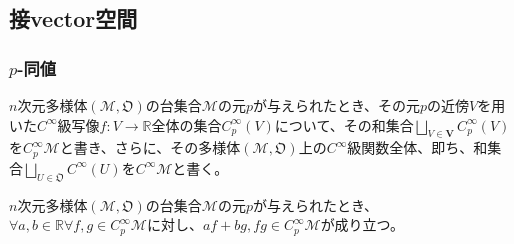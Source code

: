 \documentclass[dvipdfmx]{jsarticle}
\begin{document}
\subsection{接vector空間}
\subsubsection{$p$-同値}
\begin{dfn}
  $n$次元多様体$\left(\mathcal{M},\mathfrak{O}\right)$の台集合$\mathcal{M}$の元$p$が与えられたとき、その元$p$の近傍$V$を用いた$C^{\infty} $級写像$f:V\rightarrow \mathbb{R} $全体の集合$C^\infty_p \left( V\right)$について、その和集合$\bigsqcup_{V\in \mathbf{V}} C^\infty_p \left( V\right)$を$C^\infty_p \mathcal{M}$と書き、さらに、その多様体$\left(\mathcal{M},\mathfrak{O}\right)$上の$C^\infty $級関数全体、即ち、和集合$\bigsqcup_{U\in \mathfrak{O} } C^\infty \left(U\right)$を$C^\infty \mathcal{M}$と書く。
\end{dfn}
\begin{thm}\label{8.3.3.1}
  $n$次元多様体$\left(\mathcal{M},\mathfrak{O}\right)$の台集合$\mathcal{M}$の元$p$が与えられたとき、$\forall a,b\in \mathbb{R} \forall f,g\in C^\infty_p \mathcal{M}$に対し、$af+bg,fg\in C^\infty_p \mathcal{M} $が成り立つ。
\end{thm}
\end{document}
